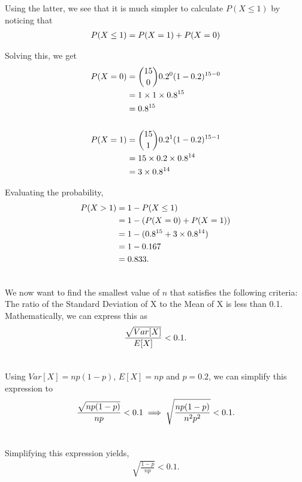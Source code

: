 \begin{subquestions}
\begin{subsubquestions}
Using the latter, we see that it is much simpler to calculate $P(X\leq1) $   by noticing that 
\begin{align}
P(X \leq 1)  =  P(X=1)+P(X=0) \nonumber
\end{align}

Solving this, we get
\begin{align}
	P(X=0)&={ 15 \choose 0} 0.2^0 (1-0.2)^{15-0} \nonumber \\
	&=1\times1\times0.8^{15} \nonumber \\
	&=0.8^{15}\nonumber \\ \nonumber \\
	P(X=1)&={ 15 \choose 1} 0.2^1 (1-0.2)^{15-1} \nonumber \\
	&=15 \times 0.2 \times 0.8^{14} \nonumber \\
	&=3\times 0.8^{14} \nonumber
\end{align}

Evaluating the probability,
\begin{align}
	P(X>1)&=1-P(X\leq1) \nonumber \\
	&=1-(P(X=0)+P(X=1)) \nonumber \\
	&=1-(0.8^{15}+3\times0.8^{14}) \nonumber \\
	&=1- 0.167 \nonumber \\
	&=0.833. \nonumber \\ \nonumber
	\end{align}



\subsubquestion
We now want to find the smallest value of $n$ that satisfies the following criteria: \\The ratio of the Standard Deviation of X to the Mean of X is less than 0.1.\\

Mathematically, we can express this as
\begin{align}
	\frac{\sqrt{Var[X]}}{E[X]}< 0.1.  \\ \nonumber
	\end{align}

Using $Var[X]=np(1-p)$, $E[X]=np$ and $p=0.2$, we can simplify this expression to
\begin{align}
	\frac{\sqrt{np(1-p)}}{np}<0.1 \implies \sqrt{\frac{np(1-p)}{n^2p^2}}<0.1.  \\ \nonumber
	\end{align}

Simplifying this expression yields,
\begin{align}
	\sqrt{\frac{1-p}{np}}<0.1.
	\end{align}


\end{subsubquestions}
\end{subquestions}
